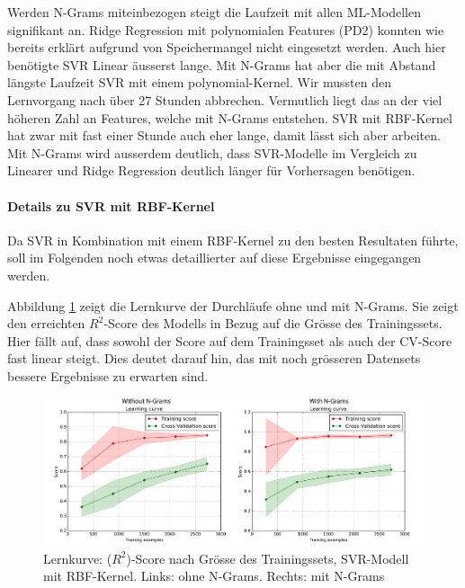 \documentclass[10pt, a4paper]{article}
\begin{document}
Werden N-Grams miteinbezogen steigt die Laufzeit mit allen \ac{ML}-Modellen signifikant an. Ridge Regression mit polynomialen Features (PD2) konnten wie bereits erklärt aufgrund von Speichermangel nicht eingesetzt werden. Auch hier benötigte SVR Linear äusserst lange. Mit N-Grams hat aber die mit Abstand längste Laufzeit SVR mit einem polynomial-Kernel. Wir mussten den Lernvorgang nach über 27 Stunden abbrechen. Vermutlich liegt das an der viel höheren Zahl an Features, welche mit N-Grams entstehen. SVR mit \ac{RBF}-Kernel hat zwar mit fast einer Stunde auch eher lange, damit lässt sich aber arbeiten. Mit N-Grams wird ausserdem deutlich, dass SVR-Modelle im Vergleich zu Linearer und Ridge Regression deutlich länger für Vorhersagen benötigen.

\paragraph{Details zu SVR mit RBF-Kernel}
Da SVR in Kombination mit einem RBF-Kernel zu den besten Resultaten führte, soll im Folgenden noch etwas detaillierter auf diese Ergebnisse eingegangen werden.

Abbildung \ref{fig:svr_rbf_learning_curves} zeigt die Lernkurve der Durchläufe ohne und mit N-Grams. Sie zeigt den erreichten \(R^2\)-Score des Modells in Bezug auf die Grösse des Trainingssets. Hier fällt auf, dass sowohl der Score auf dem Trainingsset als auch der \ac{CV}-Score fast linear steigt. Dies deutet darauf hin, das mit noch grösseren Datensets bessere Ergebnisse zu erwarten sind.

\begin{figure}[!ht]
	\centering
	\includegraphics[width=1\textwidth]{resources/images/svr_rbf_learning_curves.png}
	\caption[Lernkurve des SVR-Modells mit RBF-Kernel]{Lernkurve: (\(R^2\))-Score nach Grösse des Trainingssets, SVR-Modell mit RBF-Kernel. Links: ohne N-Grams. Rechts: mit N-Grams}
	\label{fig:svr_rbf_learning_curves}
\end{figure}
\end{document}

